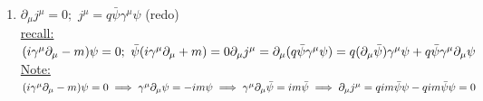 \documentclass[12pt]{amsart}
\begin{document}
\begin{enumerate}
\hdashrule[0.5ex][c]{\linewidth}{0.5pt}{1.5mm}


\item \underline{$\partial_{\mu} j^{\mu} = 0;\,\, j^{\mu} = q \bar{\psi} \gamma^{\mu} \psi$} (redo)\\
\underline{recall:} $( i \gamma^{\mu} \partial_{\mu} - m) \psi = 0;\,\, \bar{\psi}(i \gamma^{\mu} \partial_{\mu} + m) = 0\\
\partial_{\mu} j^{\mu} = \partial_{\mu}(q \bar{\psi} \gamma^{\mu} \psi) = q ( \partial_{\mu} \bar{\psi}) \gamma^{\mu} \psi + q \bar{\psi} \gamma^{\mu} \partial_{\mu} \psi\\$
\underline{Note:} $( i \gamma^{\mu} \partial_{\mu} - m) \psi = 0 \implies \gamma^{\mu} \partial_{\mu} \psi = - i m \psi\\
\implies \gamma^{\mu} \partial_{\mu} \bar{\psi} = i m \bar{\psi}\\
\implies \partial_{\mu} j^{\mu} = q i m \bar{\psi} \psi - q i m \bar{\psi} \psi = 0$




\end{enumerate}
\end{document}
